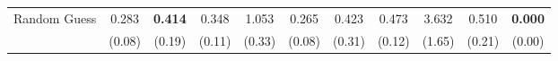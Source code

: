 \begin{table}[ht]
{\begin{tabular}{l ccc cccc cc c}
            \addlinespace[0.2em]
            Random Guess      & 0.283                                           & \textbf{0.414}                               & 0.348                                         & 1.053                   & 0.265          & 0.423          & 0.473          & 3.632           & 0.510          & \textbf{0.000}    \\
                              & (0.08)                                          & (0.19)                                       & (0.11)                                        & (0.33)                  & (0.08)         & (0.31)         & (0.12)         & (1.65)          & (0.21)         & (0.00)            \\
            \bottomrule
        \end{tabular}%
    }
\end{table}